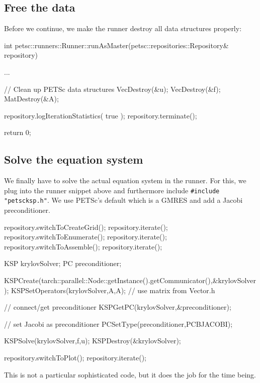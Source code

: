 \subsection{Free the data}

Before we continue, we make the runner
destroy all data structures properly:

\begin{code}
int petsc::runners::Runner::runAsMaster(petsc::repositories::Repository& repository) {
  ...
  
  // Clean up PETSc data structures
  VecDestroy(&u);
  VecDestroy(&f);
  MatDestroy(&A);

  repository.logIterationStatistics( true );
  repository.terminate();

  return 0;
}
\end{code}



\subsection{Solve the equation system}


We finally have to solve the actual equation system in the runner. For this, we
plug into the runner snippet above and furthermore include
\texttt{\#include "petscksp.h"}. We use PETSc's default which is a GMRES
and add a Jacobi preconditioner.

\begin{code}
repository.switchToCreateGrid(); repository.iterate();
repository.switchToEnumerate(); repository.iterate();
repository.switchToAssemble(); repository.iterate();

KSP krylovSolver;
PC  preconditioner;

KSPCreate(tarch::parallel::Node::getInstance().getCommunicator(),&krylovSolver);
KSPSetOperators(krylovSolver,A,A); // use matrix from Vector.h

// connect/get preconditioner
KSPGetPC(krylovSolver,&preconditioner);

// set Jacobi as preconditioner
PCSetType(preconditioner,PCBJACOBI);

KSPSolve(krylovSolver,f,u);
KSPDestroy(&krylovSolver);

repository.switchToPlot(); repository.iterate();
\end{code}

\noindent
This is not a particular sophisticated code, but it does the job for the time
being.

